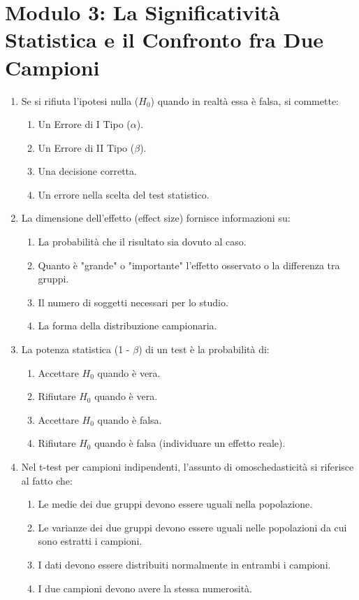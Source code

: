\documentclass[12pt, a4paper]{article}
\begin{document}
\section*{Modulo 3: La Significatività Statistica e il Confronto fra Due Campioni}
\begin{enumerate}[resume]
    \item Se si rifiuta l'ipotesi nulla ($H_0$) quando in realtà essa è falsa, si commette:
    \begin{enumerate}
        \item Un Errore di I Tipo ($\alpha$).
        \item Un Errore di II Tipo ($\beta$).
        \item Una decisione corretta.
        \item Un errore nella scelta del test statistico.
    \end{enumerate}
    \vspace{0.3cm}

    \item La dimensione dell'effetto (effect size) fornisce informazioni su:
    \begin{enumerate}
        \item La probabilità che il risultato sia dovuto al caso.
        \item Quanto è "grande" o "importante" l'effetto osservato o la differenza tra gruppi.
        \item Il numero di soggetti necessari per lo studio.
        \item La forma della distribuzione campionaria.
    \end{enumerate}
    \vspace{0.3cm}

    \item La potenza statistica (1 - $\beta$) di un test è la probabilità di:
    \begin{enumerate}
        \item Accettare $H_0$ quando è vera.
        \item Rifiutare $H_0$ quando è vera.
        \item Accettare $H_0$ quando è falsa.
        \item Rifiutare $H_0$ quando è falsa (individuare un effetto reale).
    \end{enumerate}
    \vspace{0.3cm}

    \item Nel t-test per campioni indipendenti, l'assunto di omoschedasticità si riferisce al fatto che:
    \begin{enumerate}
        \item Le medie dei due gruppi devono essere uguali nella popolazione.
        \item Le varianze dei due gruppi devono essere uguali nelle popolazioni da cui sono estratti i campioni.
        \item I dati devono essere distribuiti normalmente in entrambi i campioni.
        \item I due campioni devono avere la stessa numerosità.
    \end{enumerate}
    \vspace{0.3cm}


\end{enumerate}
\end{document}
